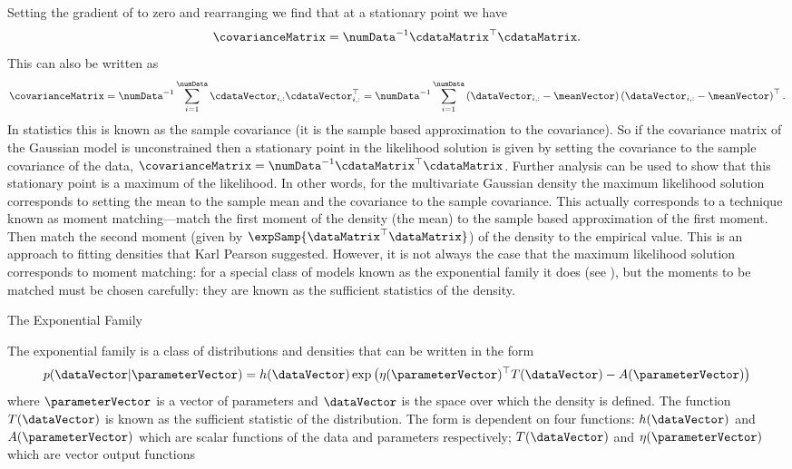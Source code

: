Setting the gradient of  to zero and
rearranging we find that at a stationary point we have
\[
\covarianceMatrix = \numData^{-1}\cdataMatrix^\top\cdataMatrix.
\]
This can also be written as
\[
\covarianceMatrix = \numData^{-1} \sum_{i=1}^\numData \cdataVector_{i,
  :}\cdataVector_{i, :}^\top = \numData^{-1}\sum_{i=1}^\numData
\left(\dataVector_{i, :}-\meanVector\right)\left(\dataVector_{i,
    :}-\meanVector\right)^\top.
\]
In statistics this is known as the sample covariance (it is the sample
based approximation to the covariance). So if the covariance matrix of
the Gaussian model is unconstrained then a stationary point in the
likelihood solution is given by setting the covariance to the sample
covariance of the data, $\covarianceMatrix =
\numData^{-1}\cdataMatrix^\top\cdataMatrix$. Further analysis can be
used to show that this stationary point is a maximum of the
likelihood. In other words, for the multivariate
Gaussian density the maximum likelihood solution corresponds to
setting the mean to the sample mean and the covariance to the sample
covariance. This actually corresponds to a technique known as moment
matching---match the first moment of the
density (the mean) to the sample based approximation of the first
moment. Then match the second moment (given by
$\expSamp{\dataMatrix^\top\dataMatrix}$) of the density to the
empirical value. This is an approach to fitting densities that Karl
Pearson suggested. However, it is not always the
case that the maximum likelihood solution corresponds to moment
matching: for a special class of models known as the exponential
family it does (see ), but the moments
to be matched must be chosen carefully: they are known as the
sufficient statistics of the density.

\begin{boxfloat}
  \caption{The Exponential Family}\label{box:exponentialFamily}

  \boxfontsize The exponential family is a class of distributions and
  densities that can be written in the form
  \[
  p(\dataVector | \parameterVector) = h(\dataVector) \exp \left(\eta(\parameterVector)^\top T(\dataVector) - A(\parameterVector)\right)
  \]
  where $\parameterVector$ is a vector of parameters and $\dataVector$
  is the space over which the density is defined. The function
  $T(\dataVector)$ is known as the sufficient statistic of the
  distribution. The form is dependent on four functions:
  $h(\dataVector)$ and $A(\parameterVector)$ which are scalar
  functions of the data and parameters respectively; $T(\dataVector)$
  and $\eta(\parameterVector)$ which are vector output functions


  

\end{boxfloat}

